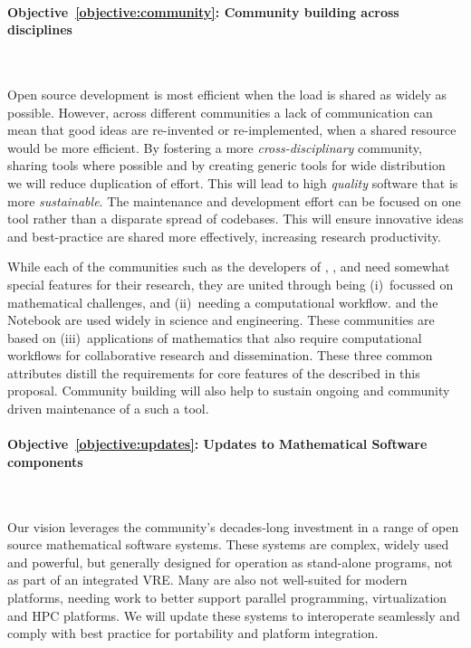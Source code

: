 \documentclass[noworkareas,deliverables,\classoptions]{euproposal}       %
\begin{document}
\begin{proposal}
\paragraph{Objective~\ref{objective:community}: Community building across disciplines}\ 

Open source development is most efficient when the load is shared as
widely as possible. However, across different communities a lack of
communication can mean that good ideas are re-invented or
re-implemented, when a shared resource would be more efficient. By
fostering a more \emph{cross-disciplinary} community, sharing tools
where possible and by creating generic tools for wide distribution we
will reduce duplication of effort. This will lead to high
\emph{quality} software that is more \emph{sustainable}. The
maintenance and development effort can be focused on one tool rather
than a disparate spread of codebases. This will ensure innovative
ideas and best-practice are shared more effectively, increasing
research productivity.

While each of the communities such as the developers of \Sage,
\Singular, and \GAP need somewhat special features for their research,
they are united through being (i)~focussed on mathematical challenges,
and (ii)~needing a computational workflow. \IPython and the \Jupyter
Notebook are used widely in science and engineering. These communities
are based on (iii)~applications of mathematics that also require
computational workflows for collaborative research and
dissemination. These three common attributes distill the requirements
for core features of the \VREs described in this proposal. Community
building will also help to sustain ongoing and community driven
maintenance of a such a tool.


\paragraph{Objective~\ref{objective:updates}: Updates to Mathematical
  Software components}\

Our vision leverages the community's decades-long investment in a
range of open source mathematical software systems. These systems are
complex, widely used and powerful, but generally designed for
operation as stand-alone programs, not as part of an integrated
VRE. Many are also not well-suited for modern platforms, needing work
to better support parallel programming, virtualization and HPC
platforms. We will update these systems to interoperate seamlessly and
comply with best practice for portability and platform integration.



\end{proposal}
\end{document}
